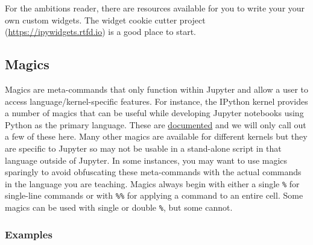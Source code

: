 \documentclass[]{book}
\begin{document}
For the ambitions reader, there are resources available for you to
write your your own custom widgets. The widget cookie cutter project
(\url{https://ipywidgets.rtfd.io}) is a good
place to start.

\hypertarget{magics}{%
\subsection{Magics}\label{magics}}

Magics are meta-commands that only function within Jupyter and allow a
user to access language/kernel-specific features. For instance, the
IPython kernel provides a number of magics that can be useful while
developing Jupyter notebooks using Python as the primary
language. These are
\href{https://ipython.readthedocs.io/en/stable/interactive/magics.html}{documented}
and we will only call out a few of these here. Many other magics are
available for different kernels but they are specific to Jupyter so
may not be usable in a stand-alone script in that language outside of
Jupyter. In some instances, you may want to use magics sparingly to
avoid obfuscating these meta-commands with the actual commands in the
language you are teaching. Magics always begin with either a single
\texttt{\%} for single-line commands or with \texttt{\%\%} for applying a command to an
entire cell. Some magics can be used with single or double \texttt{\%}, but
some cannot.

\hypertarget{examples}{%
\subsubsection*{Examples}\label{examples}}
\end{document}
